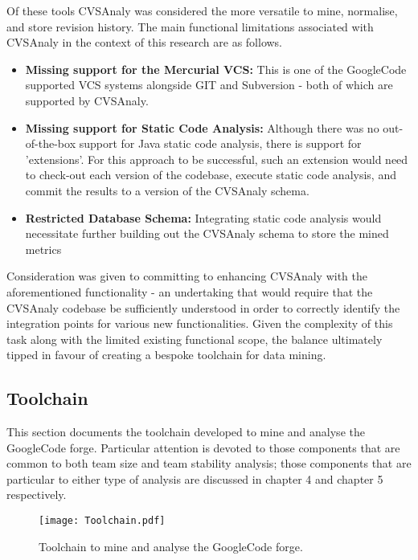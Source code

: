 Of these tools CVSAnaly was considered the more versatile to mine, normalise, and store revision history. The main functional limitations associated with CVSAnaly in the context of this research are as follows.

\begin{itemize}
\item \textbf{Missing support for the Mercurial VCS:} This is one of the GoogleCode supported VCS systems alongside GIT and Subversion - both of which are supported by CVSAnaly.
\item \textbf{Missing support for Static Code Analysis:} Although there was no out-of-the-box support for Java static code analysis, there is support for 'extensions'. For this approach to be successful, such an extension would need to check-out each version of the codebase, execute static code analysis, and commit the results to a version of the CVSAnaly schema.
\item \textbf{Restricted Database Schema:} Integrating static code analysis would necessitate further building out the CVSAnaly schema to store the mined metrics 
\end{itemize}

Consideration was given to committing to enhancing CVSAnaly with the aforementioned functionality - an undertaking that would require that the CVSAnaly codebase be sufficiently understood in order to correctly identify the integration points for various new functionalities. Given the complexity of this task along with the limited existing functional scope, the balance ultimately tipped in favour of creating a bespoke toolchain for data mining. 

\subsection{Toolchain}
This section documents the toolchain developed to mine and analyse the GoogleCode forge. Particular attention is devoted to those components that are common to both team size and team stability analysis; those components that are particular to either type of analysis are discussed in chapter 4 and chapter 5 respectively.

\begin{figure}[htbp!] 
\centering    
\texttt{[image: Toolchain.pdf]}
\caption{Toolchain to mine and analyse the GoogleCode forge.}
\label{fig:Toolchain}
\end{figure}

